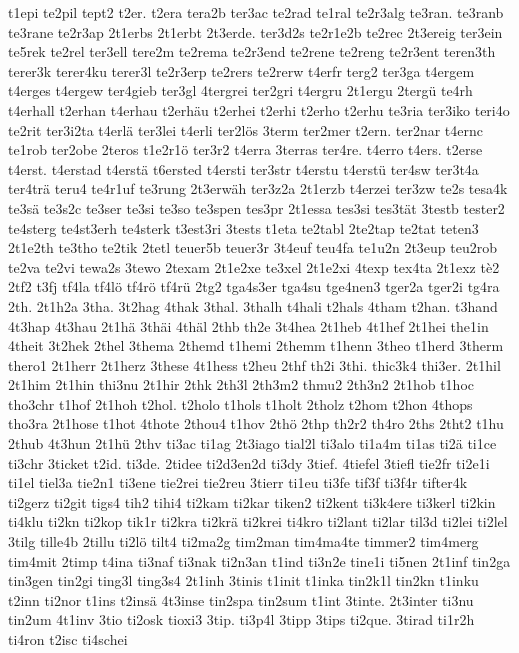 {t1epi
te2pil
tept2
t2er.
t2era
tera2b
ter3ac
te2rad
te1ral
te2r3alg
te3ran.
te3ranb
te3rane
te2r3ap
2t1erbs
2t1erbt
2t3erde.
ter3d2s
te2r1e2b
te2rec
2t3ereig
ter3ein
te5rek
te2rel
ter3ell
tere2m
te2rema
te2r3end
te2rene
te2reng
te2r3ent
teren3th
terer3k
terer4ku
terer3l
te2r3erp
te2rers
te2rerw
t4erfr
terg2
ter3ga
t4ergem
t4erges
t4ergew
ter4gieb
ter3gl
4tergrei
ter2gri
t4ergru
2t1ergu
2tergü
te4rh
t4erhall
t2erhan
t4erhau
t2erhäu
t2erhei
t2erhi
t2erho
t2erhu
te3ria
ter3iko
teri4o
te2rit
ter3i2ta
t4erlä
ter3lei
t4erli
ter2lös
3term
ter2mer
t2ern.
ter2nar
t4ernc
te1rob
ter2obe
2teros
t1e2r1ö
ter3r2
t4erra
3terras
ter4re.
t4erro
t4ers.
t2erse
t4erst.
t4erstad
t4erstä
t6ersted
t4ersti
ter3str
t4erstu
t4erstü
ter4sw
ter3t4a
ter4trä
teru4
te4r1uf
te3rung
2t3erwäh
ter3z2a
2t1erzb
t4erzei
ter3zw
te2s
tesa4k
te3sä
te3s2c
te3ser
te3si
te3so
te3spen
tes3pr
2t1essa
tes3si
tes3tät
3testb
tester2
te4sterg
te4st3erh
te4sterk
t3est3ri
3tests
t1eta
te2tabl
2te2tap
te2tat
teten3
2t1e2th
te3tho
te2tik
2tetl
teuer5b
teuer3r
3t4euf
teu4fa
te1u2n
2t3eup
teu2rob
te2va
te2vi
tewa2s
3tewo
2texam
2t1e2xe
te3xel
2t1e2xi
4texp
tex4ta
2t1exz
tè2
2tf2
t3fj
tf4la
tf4lö
tf4rö
tf4rü
2tg2
tga4s3er
tga4su
tge4nen3
tger2a
tger2i
tg4ra
2th.
2t1h2a
3tha.
3t2hag
4thak
3thal.
3thalh
t4hali
t2hals
4tham
t2han.
t3hand
4t3hap
4t3hau
2t1hä
3thäi
4thäl
2thb
th2e
3t4hea
2t1heb
4t1hef
2t1hei
the1in
4theit
3t2hek
2thel
3thema
2themd
t1hemi
2themm
t1henn
3theo
t1herd
3therm
thero1
2t1herr
2t1herz
3these
4t1hess
t2heu
2thf
th2i
3thi.
thic3k4
thi3er.
2t1hil
2t1him
2t1hin
thi3nu
2t1hir
2thk
2th3l
2th3m2
thmu2
2th3n2
2t1hob
t1hoc
tho3chr
t1hof
2t1hoh
t2hol.
t2holo
t1hols
t1holt
2tholz
t2hom
t2hon
4thops
tho3ra
2t1hose
t1hot
4thote
2thou4
t1hov
2thö
2thp
th2r2
th4ro
2ths
2tht2
t1hu
2thub
4t3hun
2t1hü
2thv
ti3ac
ti1ag
2t3iago
tial2l
ti3alo
ti1a4m
ti1as
ti2ä
ti1ce
ti3chr
3ticket
t2id.
ti3de.
2tidee
ti2d3en2d
ti3dy
3tief.
4tiefel
3tiefl
tie2fr
ti2e1i
ti1el
tiel3a
tie2n1
ti3ene
tie2rei
tie2reu
3tierr
ti1eu
ti3fe
tif3f
ti3f4r
tifter4k
ti2gerz
ti2git
tigs4
tih2
tihi4
ti2kam
ti2kar
tiken2
ti2kent
ti3k4ere
ti3kerl
ti2kin
ti4klu
ti2kn
ti2kop
tik1r
ti2kra
ti2krä
ti2krei
ti4kro
ti2lant
ti2lar
til3d
ti2lei
ti2lel
3tilg
tille4b
2tillu
ti2lö
tilt4
ti2ma2g
tim2man
tim4ma4te
timmer2
tim4merg
tim4mit
2timp
t4ina
ti3naf
ti3nak
ti2n3an
t1ind
ti3n2e
tine1i
ti5nen
2t1inf
tin2ga
tin3gen
tin2gi
ting3l
ting3s4
2t1inh
3tinis
t1init
t1inka
tin2k1l
tin2kn
t1inku
t2inn
ti2nor
t1ins
t2insä
4t3inse
tin2spa
tin2sum
t1int
3tinte.
2t3inter
ti3nu
tin2um
4t1inv
3tio
ti2osk
tioxi3
3tip.
ti3p4l
3tipp
3tips
ti2que.
3tirad
ti1r2h
ti4ron
t2isc
ti4schei
}
